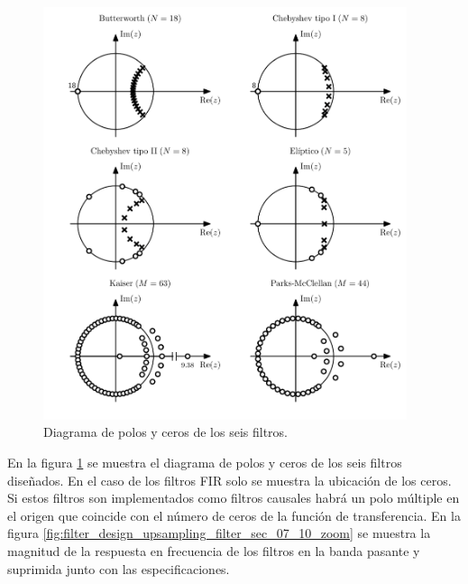 \documentclass[a4paper]{report}
\begin{document}
\begin{figure}[!htb]
 \begin{center}
 \includegraphics[width=0.95\textwidth]{figuras/filter_design_upsampling_filter_sec_07_10_zero_pole.pdf}
 \caption{\label{fig:filter_design_upsampling_filter_sec_07_10_zero_pole} Diagrama de polos y ceros de los seis filtros.}
 \end{center}
\end{figure}
En la figura \ref{fig:filter_design_upsampling_filter_sec_07_10_zero_pole} se muestra el diagrama de polos y ceros de los seis filtros diseñados. En el caso de los filtros FIR solo se muestra la ubicación de los ceros. Si estos filtros son implementados como filtros causales habrá un polo múltiple en el origen que coincide con el número de ceros de la función de transferencia. En la figura \ref{fig:filter_design_upsampling_filter_sec_07_10_zoom} se muestra la magnitud de la respuesta en frecuencia de los filtros en la banda pasante y suprimida junto con las especificaciones.
\end{document}
